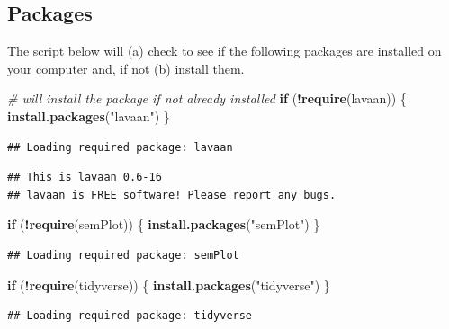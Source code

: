 \documentclass[
  11pt,
]{book}
\newenvironment{Shaded}{\begin{snugshade}}{\end{snugshade}}
\newcommand{\CommentTok}[1]{\textcolor[rgb]{0.37,0.37,0.37}{\textit{#1}}}
\newcommand{\ControlFlowTok}[1]{\textcolor[rgb]{0.27,0.27,0.27}{\textbf{#1}}}
\newcommand{\FunctionTok}[1]{\textcolor[rgb]{0.27,0.27,0.27}{\textbf{#1}}}
\newcommand{\NormalTok}[1]{#1}
\newcommand{\SpecialCharTok}[1]{\textcolor[rgb]{0.43,0.43,0.43}{\textbf{#1}}}
\newcommand{\StringTok}[1]{\textcolor[rgb]{0.5,0.5,0.5}{#1}}
\begin{document}
\hypertarget{packages-7}{%
\subsection{Packages}\label{packages-7}}

The script below will (a) check to see if the following packages are installed on your computer and, if not (b) install them.

\begin{Shaded}
\begin{Highlighting}[]
\CommentTok{\# will install the package if not already installed}
\ControlFlowTok{if}\NormalTok{ (}\SpecialCharTok{!}\FunctionTok{require}\NormalTok{(lavaan)) \{}
    \FunctionTok{install.packages}\NormalTok{(}\StringTok{"lavaan"}\NormalTok{)}
\NormalTok{\}}
\end{Highlighting}
\end{Shaded}

\begin{verbatim}
## Loading required package: lavaan
\end{verbatim}

\begin{verbatim}
## This is lavaan 0.6-16
## lavaan is FREE software! Please report any bugs.
\end{verbatim}

\begin{Shaded}
\begin{Highlighting}[]
\ControlFlowTok{if}\NormalTok{ (}\SpecialCharTok{!}\FunctionTok{require}\NormalTok{(semPlot)) \{}
    \FunctionTok{install.packages}\NormalTok{(}\StringTok{"semPlot"}\NormalTok{)}
\NormalTok{\}}
\end{Highlighting}
\end{Shaded}

\begin{verbatim}
## Loading required package: semPlot
\end{verbatim}

\begin{Shaded}
\begin{Highlighting}[]
\ControlFlowTok{if}\NormalTok{ (}\SpecialCharTok{!}\FunctionTok{require}\NormalTok{(tidyverse)) \{}
    \FunctionTok{install.packages}\NormalTok{(}\StringTok{"tidyverse"}\NormalTok{)}
\NormalTok{\}}
\end{Highlighting}
\end{Shaded}

\begin{verbatim}
## Loading required package: tidyverse
\end{verbatim}
\end{document}
